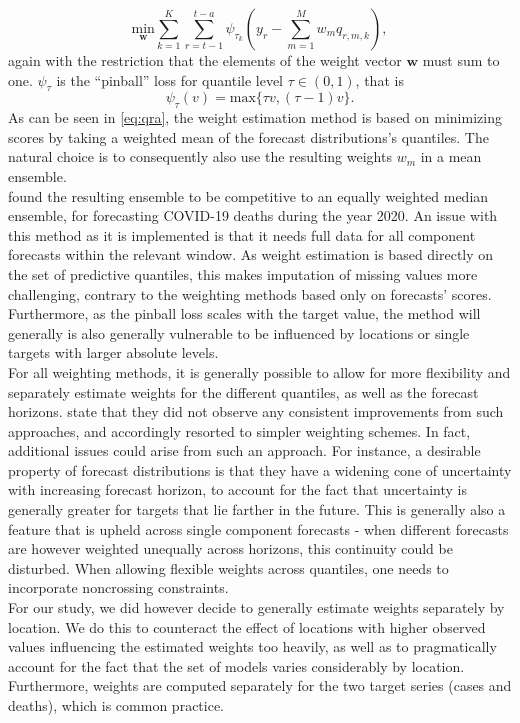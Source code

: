 \begin{equation} \label{eq:qra}
\underset{\bm{w}}{\text{min}} \sum_{k=1}^{K} \sum_{r = t-1}^{t-a} \psi_{\tau_k}(y_r - \sum_{m=1}^{M}w_m q_{r,m,k}),
\end{equation}
again with the restriction that the elements of the weight vector $\bm{w}$ must sum to one. $\psi_{\tau}$ is the ``pinball'' loss for quantile level $\tau \in (0,1)$, that is 
\begin{equation}
\psi_{\tau}(v) = \text{max}\{\tau v, (\tau-1)v\}.
\end{equation}
As can be seen in \cref{eq:qra}, the weight estimation method is based on minimizing scores by taking a weighted mean of the forecast distributions's quantiles. The natural choice is to consequently also use the resulting weights $w_m$ in a mean ensemble. \\
\cite{brooks_comparing_2020} found the resulting ensemble to be competitive to an equally weighted median ensemble, for forecasting COVID-19 deaths during the year 2020. An issue with this method as it is implemented is{} that it needs full data for all component forecasts within the relevant window. As weight estimation is based directly on the set of predictive quantiles, this makes imputation of missing values more challenging, contrary to the weighting methods based only on forecasts' scores. Furthermore, as the pinball loss scales with the target value, the method will generally is also generally vulnerable to be influenced by locations or single targets with larger absolute levels.\medskip\\
For all weighting methods, it is generally possible to allow for more flexibility and separately estimate weights for the different quantiles, as well as the forecast horizons. \cite{ray_comparing_2022} state that they did not observe any consistent improvements from such approaches, and accordingly resorted to simpler weighting schemes. In fact, additional issues could arise from such an approach. For instance, a desirable property of forecast distributions is that they have a widening cone of uncertainty with increasing forecast horizon, to account for the fact that uncertainty is generally greater for targets that lie farther in the future. This is generally also a feature that is upheld across single component forecasts - when different forecasts are however weighted unequally across horizons, this continuity could be disturbed. When allowing flexible weights across quantiles, one needs to incorporate noncrossing constraints. \\
For our study, we did however decide to generally estimate weights separately by location. We do this to counteract the effect of locations with higher observed values influencing the estimated weights too heavily, as well as to pragmatically account for the fact that the set of models varies considerably by location. Furthermore, weights are computed separately for the two target series (cases and deaths), which is common practice.\\
\newpage
